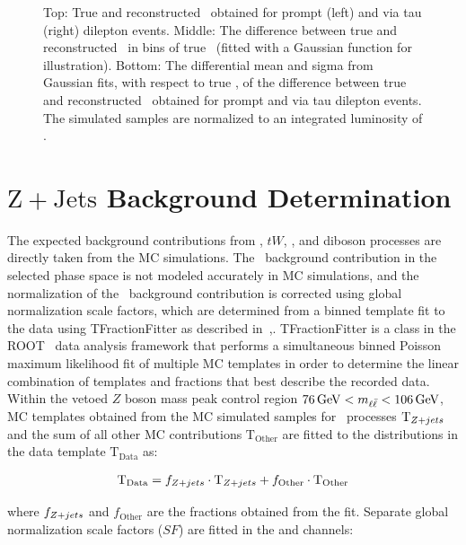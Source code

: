 \begin{figure}
\begin{center}
    \caption{\small Top: True and reconstructed \yt\ obtained for prompt (left) and via tau (right) \ttbar dilepton events.
    Middle: The difference between true and reconstructed \yt\ in bins of true \yt\ (fitted with a Gaussian function for illustration).
    Bottom: The differential mean and sigma from Gaussian fits, with respect to true \yt, of the difference between true and reconstructed \yt\ obtained for prompt and via tau \ttbar dilepton events.
    The simulated samples are normalized to an integrated luminosity of \lumivalueRuniiUL.}
    \label{fig:kinrec:resolution-yt}
 \end{center}
\end{figure}

\clearpage
\section{\ensuremath{\mathrm{Z+Jets}} Background Determination}
\label{Zjets_Background_Determination}
The expected background contributions from \ttbar, $tW$, \wjets, and diboson processes are directly taken from the MC simulations.
The \zjets\ background contribution in the selected phase space is not modeled accurately in MC simulations, and the normalization of the \zjets\ background contribution is corrected using global normalization scale factors, which are determined from a binned template fit to the data using TFractionFitter as described in~\cite{CMS-PAS-TOP-20-006},\cite{BARLOW1993219}.
TFractionFitter is a class in the ROOT~\cite{Antcheva:2011zz} data analysis framework that performs a simultaneous binned Poisson maximum likelihood fit of multiple MC templates in order to determine the linear combination of templates and fractions that best describe the recorded data. 
Within the vetoed $Z$ boson mass peak control region $\SI{76}{\GeV} < \mll < \SI{106}{\GeV}$, MC templates obtained from the MC simulated samples for \zjets\ processes $\text{T}_{Z+jets}$ and the sum of all other MC contributions $\text{T}_\text{Other}$ are fitted to the \mll distributions in the data template $\text{T}_\text{Data}$ as:
\begin{linenomath*}
\begin{align}
\text{T}_\text{Data} = f_{Z+jets} \cdot \text{T}_{Z+jets} + f_{\text{Other}} \cdot \text{T}_\text{Other}
\end{align}
\end{linenomath*}
where $f_{Z+jets}$ and $f_{\text{Other}}$ are the fractions obtained from the fit.
Separate global normalization scale factors ($SF$) are fitted in the \ee and \mumu channels:

